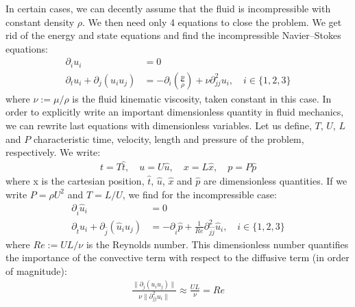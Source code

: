 \begin{subappendices}
	In certain cases, we can decently assume that the fluid is incompressible with constant density $\rho$. We then need only 4 equations to close the problem. We get rid of the energy and state equations and find the incompressible Navier–Stokes equations:
	\begin{align}
		\partial_i u_i &= 0 \\
		\partial_tu_i + \partial_j(u_iu_j) &= -\partial_i\left(\frac{p}{\rho}\right) + \nu\partial^2_{jj}u_i, \quad i\in\{1,2,3\}
	\end{align}
	where $\nu := \mu/\rho$ is the fluid kinematic viscosity, taken constant in this case. In order to explicitly write an important dimensionless quantity in fluid mechanics, we can rewrite last equations with dimensionless variables. Let us define, $T$, $U$, $L$ and $P$ characteristic time, velocity, length and pressure of the problem, respectively. We write:
	\begin{align}
		t = T\hat{t}, \quad u = U\hat{u}, \quad x = L\hat{x}, \quad p = P\hat{p}
	\end{align}
	where x is the cartesian position, $\hat{t}$, $\hat{u}$, $\hat{x}$ and $\hat{p}$ are dimensionless quantities. If we write $P = \rho U^2$ and $T = L/U$, we find for the incompressible case:
	\begin{align}
		\partial_{\hat{i}} \hat{u}_i &= 0 \\
		\partial_{\hat{t}}\hat{u}_i + \partial_{\hat{j}}(\hat{u}_i\hat{u}_j) &= -\partial_{\hat{i}}\hat{p} + \frac{1}{Re}\partial^2_{\hat{j}\hat{j}}\hat{u}_i, \quad i\in\{1,2,3\}
	\end{align}
	where $Re := UL/\nu$ is the Reynolds number. This dimensionless number quantifies the importance of the convective term with respect to the diffusive term (in order of magnitude):
	\begin{align}
		\frac{\|\partial_j (u_iu_j)\|}{\nu\|\partial^2_{jj}u_i\|} \approx \frac{UL}{\nu} = Re
	\end{align}

\end{subappendices}
